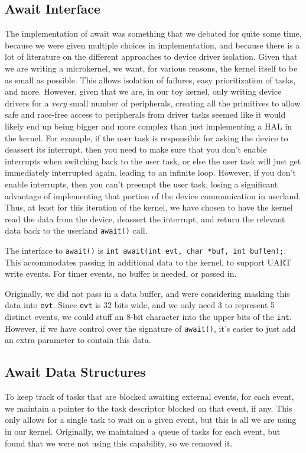 \documentclass[titlepage]{article}
\begin{document}
\subsection{Await Interface}
The implementation of await was something that we debated for quite some time,
because we were given multiple choices in implementation, and because there is
a lot of literature on the different approaches to device driver isolation.
Given that we are writing a microkernel, we want, for various reasons, the
kernel itself to be as small as possible. This allows isolation of failures,
easy prioritization of tasks, and more. However, given that we are, in our toy
kernel, only writing device drivers for a \emph{very} small number of
peripherals, creating all the primitives to allow safe and race-free access
to peripherals from driver tasks seemed like it would likely end up being
bigger and more complex than just implementing a HAL in the kernel. For
example, if the user task is responsible for asking the device to deassert
its interrupt, then you need to make sure that you don't enable interrupts
when switching back to the user task, or else the user task will just get
immediately interrupted again, leading to an infinite loop. However, if you
don't enable interrupts, then you can't preempt the user task, losing a
significant advantage of implementing that portion of the device communication
in userland. Thus, at least for this iteration of the kernel, we have chosen
to have the kernel read the data from the device, deassert the interrupt,
and return the relevant data back to the userland \texttt{await()} call.

The interface to \texttt{await()} is \texttt{int await(int evt, char *buf, int buflen);}.
This accommodates passing in additional data to the kernel, to support UART write events.
For timer events, no buffer is needed, or passed in.

Originally, we did not pass in a data buffer, and were considering masking this data
into \texttt{evt}.
Since \texttt{evt} is 32 bits wide, and we only need 3 to represent 5 distinct events,
we could stuff an 8-bit character into the upper bits of the \texttt{int}.
However, if we have control over the signature of \texttt{await()}, it's easier to just
add an extra parameter to contain this data.

\subsection{Await Data Structures}
To keep track of tasks that are blocked awaiting external events, for each event,
we maintain a pointer to the task descriptor blocked on that event, if any.
This only allows for a single task to wait on a given event, but this is all
we are using in our kernel.
Originally, we maintained a queue of tasks for each event, but found
that we were not using this capability, so we removed it.
\end{document}
